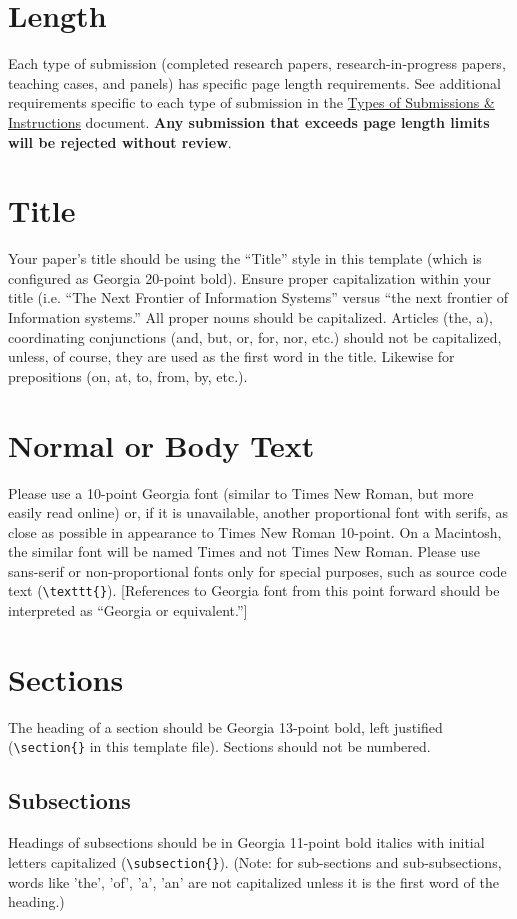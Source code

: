 \documentclass{icis}
\begin{document}
\section{Length}
Each type of submission (completed research papers, research-in-progress papers,
teaching cases, and panels) has specific page length requirements. See
additional requirements specific to each type of submission in the \href{https://icis2022.aisconferences.org/submissions/types-of-submissions/}{Types of Submissions \& Instructions} document. \textbf{Any submission that
exceeds page length limits will be rejected without review}.

\section{Title}
Your paper’s title should be using the “Title” style in this template (which is configured as Georgia 20-point bold). Ensure proper capitalization within your title (i.e. “The Next Frontier of Information Systems” versus “the next frontier of Information systems.” 
All proper nouns should be capitalized. Articles (the, a), coordinating conjunctions (and, but, or, for, nor, etc.) should not be capitalized, unless, of course, they are used as the first word in the title. Likewise for prepositions (on, at, to, from, by, etc.).

\section{Normal or Body Text}
Please use a 10-point Georgia font (similar to Times New Roman, but more easily
read online) or, if it is unavailable, another proportional font with serifs, as
close as possible in appearance to Times New Roman 10-point. On a Macintosh, the
similar font will be named Times and not Times New Roman. Please use sans-serif
or non-proportional fonts only for special purposes, such as source code text
(\texttt{\textbackslash texttt\{\}}). [References to Georgia font from this
point forward should be interpreted as ``Georgia or equivalent.'']

\section{Sections}
The heading of a section should be Georgia 13-point bold, left justified
(\texttt{\textbackslash section\{\}} in this template file).  Sections should not be numbered.

\subsection{Subsections}
Headings of subsections should be in Georgia 11-point bold italics with initial
letters capitalized (\texttt{\textbackslash subsection\{\}}). (Note: for
sub-sections and sub-subsections, words like 'the', 'of', 'a', 'an' are not
capitalized unless it is the first word of the heading.)
\end{document}
